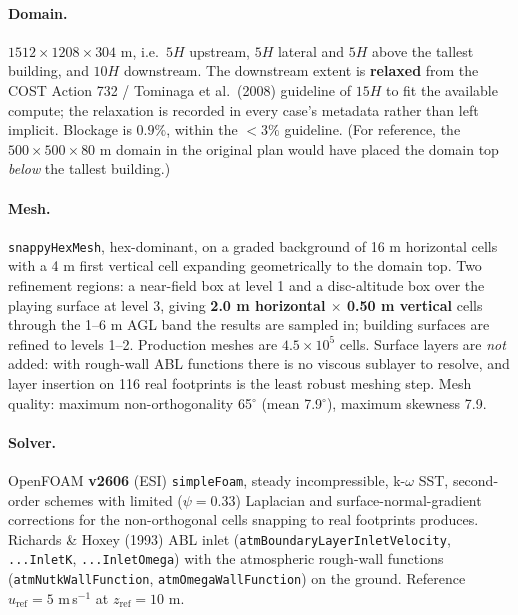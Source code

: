 \documentclass[11pt,letterpaper]{article}
\begin{document}
\paragraph{Domain.} $1512 \times 1208 \times 304$ m, i.e.\ $5H$ upstream,
$5H$ lateral and $5H$ above the tallest building, and $10H$ downstream.
The downstream extent is \textbf{relaxed} from the COST Action 732 /
Tominaga et al.\ (2008) guideline of $15H$ to fit the available compute; the
relaxation is recorded in every case's metadata rather than left implicit.
Blockage is $0.9\%$, within the $<3\%$ guideline. (For reference, the
$500\times500\times80$ m domain in the original plan would have placed the
domain top \emph{below} the tallest building.)

\paragraph{Mesh.} \texttt{snappyHexMesh}, hex-dominant, on a graded background
of 16 m horizontal cells with a 4 m first vertical cell expanding geometrically
to the domain top. Two refinement regions: a near-field box at level 1 and a
disc-altitude box over the playing surface at level 3, giving
\textbf{2.0 m horizontal $\times$ 0.50 m vertical} cells through the
1--6 m AGL band the results are sampled in; building surfaces are refined to
levels 1--2. Production meshes are $4.5\times10^{5}$ cells. Surface layers are
\emph{not} added: with rough-wall ABL functions there is no viscous sublayer to
resolve, and layer insertion on 116 real footprints is the least robust meshing
step. Mesh quality: maximum non-orthogonality 65$^\circ$ (mean 7.9$^\circ$),
maximum skewness 7.9.

\paragraph{Solver.} OpenFOAM \textbf{v2606} (ESI) \texttt{simpleFoam}, steady
incompressible, k-$\omega$ SST, second-order schemes with limited
($\psi = 0.33$) Laplacian and surface-normal-gradient corrections for the
non-orthogonal cells snapping to real footprints produces. Richards \& Hoxey
(1993) ABL inlet (\texttt{atmBoundaryLayerInletVelocity}, \texttt{...InletK},
\texttt{...InletOmega}) with the atmospheric rough-wall functions
(\texttt{atmNutkWallFunction}, \texttt{atmOmegaWallFunction}) on the ground.
Reference $u_{\text{ref}} = 5$ m\,s$^{-1}$ at $z_{\text{ref}} = 10$ m.
\end{document}
